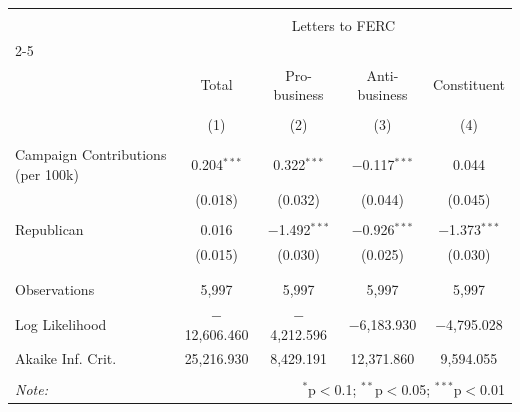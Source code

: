 
\begin{tabular}{@{\extracolsep{5pt}}lcccc} 
\\[-1.8ex]\hline 
\hline \\[-1.8ex] 
 & \multicolumn{4}{c}{Letters to FERC} \\ 
\cline{2-5} 
\\[-1.8ex] & Total & Pro-business & Anti-business & Constituent \\ 
\\[-1.8ex] & (1) & (2) & (3) & (4)\\ 
\hline \\[-1.8ex] 
 Campaign Contributions (per 100k) & 0.204$^{***}$ & 0.322$^{***}$ & $-$0.117$^{***}$ & 0.044 \\ 
  & (0.018) & (0.032) & (0.044) & (0.045) \\ 
  & & & & \\ 
 Republican & 0.016 & $-$1.492$^{***}$ & $-$0.926$^{***}$ & $-$1.373$^{***}$ \\ 
  & (0.015) & (0.030) & (0.025) & (0.030) \\ 
  & & & & \\ 
\hline \\[-1.8ex] 
Observations & 5,997 & 5,997 & 5,997 & 5,997 \\ 
Log Likelihood & $-$12,606.460 & $-$4,212.596 & $-$6,183.930 & $-$4,795.028 \\ 
Akaike Inf. Crit. & 25,216.930 & 8,429.191 & 12,371.860 & 9,594.055 \\ 
\hline 
\hline \\[-1.8ex] 
\textit{Note:}  & \multicolumn{4}{r}{$^{*}$p$<$0.1; $^{**}$p$<$0.05; $^{***}$p$<$0.01} \\ 
\end{tabular} 

